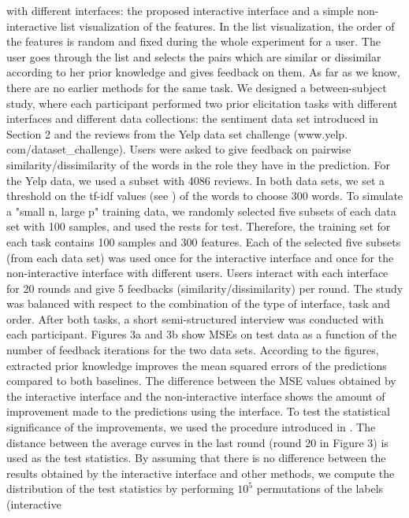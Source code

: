\documentclass{sig-alternate}
\begin{document}
with different interfaces: the proposed interactive interface and a
simple non-interactive list visualization of the features. In the list
visualization, the order of the features is random and fixed during
the whole experiment for a user. The user goes through the list and
selects the pairs which are similar or dissimilar according to her
prior knowledge and gives feedback on them. As far as we know,
there are no earlier methods for the same task.
We designed a between-subject study, where each participant
performed two prior elicitation tasks with different interfaces and
different data collections: the sentiment data set introduced in Section
2 and the reviews from the Yelp data set challenge (www.yelp.
com/dataset\_challenge). Users were asked to give feedback on pairwise
similarity/dissimilarity of the words in the role they have in
the prediction. For the Yelp data, we used a subset with 4086 reviews.
In both data sets, we set a threshold on the tf-idf values (see \cite{Jones72astatistical}
) of the words to choose 300 words. To simulate a "small n, large
p" training data, we randomly selected five subsets of each data set
with 100 samples, and used the rests for test. Therefore, the training
set for each task contains 100 samples and 300 features. Each of
the selected five subsets (from each data set) was used once for the
interactive interface and once for the non-interactive interface with
different users. Users interact with each interface for 20 rounds and
give 5 feedbacks (similarity/dissimilarity) per round. The study was
balanced with respect to the combination of the type of interface,
task and order. After both tasks, a short semi-structured interview
was conducted with each participant.
Figures 3a and 3b show MSEs on test data as a function of the
number of feedback iterations for the two data sets. According to
the figures, extracted prior knowledge improves the mean squared
errors of the predictions compared to both baselines. The difference
between the MSE values obtained by the interactive interface and
the non-interactive interface shows the amount of improvement
made to the predictions using the interface. To test the statistical
significance of the improvements, we used the procedure introduced
in \cite{Micallef:2017:IEK:3025171.3025181}. The distance between the average curves in the last round
(round 20 in Figure 3) is used as the test statistics. By assuming that
there is no difference between the results obtained by the interactive
interface and other methods, we compute the distribution of the test
statistics by performing $10^5$ permutations of the labels (interactive
\end{document}
